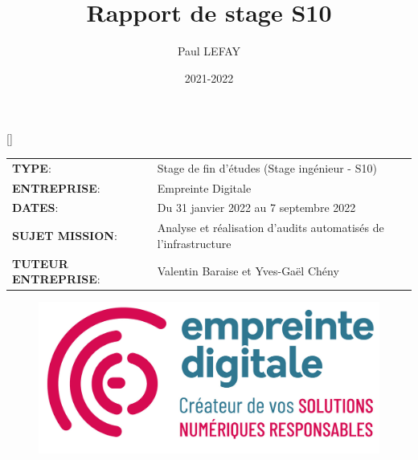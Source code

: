 \documentclass[12pt, a4paper, twoside]{article}
\title{Rapport de stage S10}
\author{Paul LEFAY}
\date{2021-2022}
\begin{document}
\setcounter{figure}{0}

\cfoot{\thepage}

\renewcommand{\headrulewidth}{0.4pt}
\renewcommand{\footrulewidth}{0.4pt}
\renewcommand{\contentsname}{}
\renewcommand{\listfigurename}{}
\renewcommand{\listtablename}{}
\renewcommand{\thebibliography}{}
\renewcommand{\glossarysection}[2][]{}
\renewcommand{\partname}{Partie}
\patchcmd{\thebibliography}{\section*{\refname}}{}{}{}
[\refname]{}

\makeatletter
\preto{\@verbatim}{\topsep=0pt \partopsep=0pt }
\makeatother
{}

\maketitle
\thispagestyle{empty}
\begin{center}
	\begin{tabular}{ m{5cm} m{11.5cm} }
	\textbf{TYPE}: & \mbox{\ooalign{$\checkmark$\cr\hidewidth$\square$\hidewidth\cr}}  Stage de fin d'études (Stage ingénieur - S10) \\
   \textbf{ENTREPRISE}:  & Empreinte Digitale \\
   \textbf{DATES}: & Du 31 janvier 2022 au 7 septembre 2022 \\
   \textbf{SUJET MISSION}: & Analyse et réalisation d'audits automatisés de l'infrastructure \\
   \textbf{TUTEUR ENTREPRISE}:  & Valentin Baraise et Yves-Gaël Chény \\
 \end{tabular}
\end{center}

\begin{figure}[!ht]
    \centering
    \includegraphics[scale=0.8]{src/logo_ed.png}
    \label{fig:ed_logo}
\end{figure}
\end{document}
